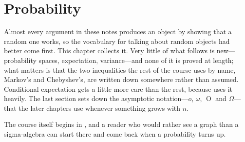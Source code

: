 \chapter{Probability} \label{Ch1:CH}
\thispagestyle{empty}

Almost every argument in these notes produces an object by showing that a random one works, so the vocabulary for talking about random objects had better come first. This chapter collects it. Very little of what follows is new---probability spaces, expectation, variance---and none of it is proved at length; what matters is that the two inequalities the rest of the course uses by name, Markov's and Chebyshev's, are written down somewhere rather than assumed. Conditional expectation gets a little more care than the rest, because  uses it heavily. The last section sets down the asymptotic notation---$o$, $\omega$, $\operatorname{O}$ and $\Omega$---that the later chapters use whenever something grows with $n$.

The course itself begins in , and a reader who would rather see a graph than a sigma-algebra can start there and come back when a probability turns up.





